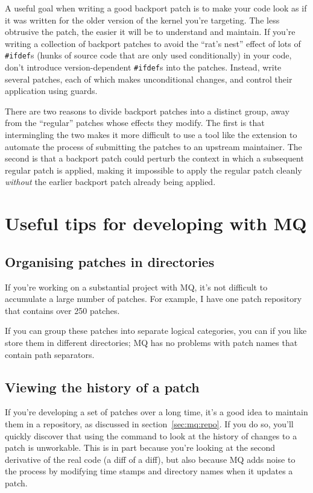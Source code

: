 A useful goal when writing a good backport patch is to make your code
look as if it was written for the older version of the kernel you're
targeting.  The less obtrusive the patch, the easier it will be to
understand and maintain.  If you're writing a collection of backport
patches to avoid the ``rat's nest'' effect of lots of
\texttt{\#ifdef}s (hunks of source code that are only used
conditionally) in your code, don't introduce version-dependent
\texttt{\#ifdef}s into the patches.  Instead, write several patches,
each of which makes unconditional changes, and control their
application using guards.

There are two reasons to divide backport patches into a distinct
group, away from the ``regular'' patches whose effects they modify.
The first is that intermingling the two makes it more difficult to use
a tool like the  extension to automate the process of
submitting the patches to an upstream maintainer.  The second is that
a backport patch could perturb the context in which a subsequent
regular patch is applied, making it impossible to apply the regular
patch cleanly \emph{without} the earlier backport patch already being
applied.

\section{Useful tips for developing with MQ}

\subsection{Organising patches in directories}

If you're working on a substantial project with MQ, it's not difficult
to accumulate a large number of patches.  For example, I have one
patch repository that contains over 250 patches.

If you can group these patches into separate logical categories, you
can if you like store them in different directories; MQ has no
problems with patch names that contain path separators.

\subsection{Viewing the history of a patch}
\label{mq-collab:tips:interdiff}

If you're developing a set of patches over a long time, it's a good
idea to maintain them in a repository, as discussed in
section~\ref{sec:mq:repo}.  If you do so, you'll quickly discover that
using the  command to look at the history of changes to a
patch is unworkable.  This is in part because you're looking at the
second derivative of the real code (a diff of a diff), but also
because MQ adds noise to the process by modifying time stamps and
directory names when it updates a patch.

